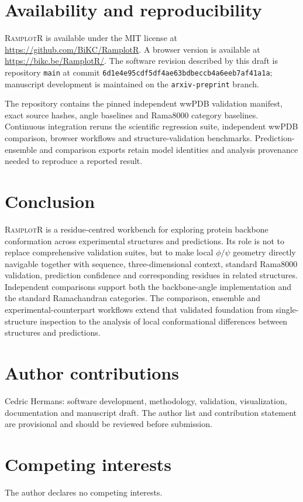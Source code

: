 \documentclass[11pt]{article}
\newcommand{\ramplotr}{\textsc{RamplotR}\xspace}
\begin{document}
\section{Availability and reproducibility}

\ramplotr is available under the MIT license at
\url{https://github.com/BiKC/RamplotR}. A browser version is available at
\url{https://bikc.be/RamplotR/}. The software revision described by this draft is repository \texttt{main} at commit \texttt{6d1e4e95cdf5df4ae63bdbeccb4a6eeb7af41a1a}; manuscript development is maintained on the \texttt{arxiv-preprint} branch.

The repository contains the pinned independent wwPDB validation manifest, exact source hashes, angle baselines and Rama8000 category baselines. Continuous integration reruns the scientific regression suite, independent wwPDB comparison, browser workflows and structure-validation benchmarks. Prediction-ensemble and comparison exports retain model identities and analysis provenance needed to reproduce a reported result.

\section{Conclusion}

\ramplotr is a residue-centred workbench for exploring protein backbone conformation across experimental structures and predictions. Its role is not to replace comprehensive validation suites, but to make local $\phi/\psi$ geometry directly navigable together with sequence, three-dimensional context, standard Rama8000 validation, prediction confidence and corresponding residues in related structures. Independent comparisons support both the backbone-angle implementation and the standard Ramachandran categories. The comparison, ensemble and experimental-counterpart workflows extend that validated foundation from single-structure inspection to the analysis of local conformational differences between structures and predictions.

\section{Author contributions}

Cedric Hermans: software development, methodology, validation, visualization, documentation and manuscript draft. The author list and contribution statement are provisional and should be reviewed before submission.

\section{Competing interests}

The author declares no competing interests.



\end{document}
